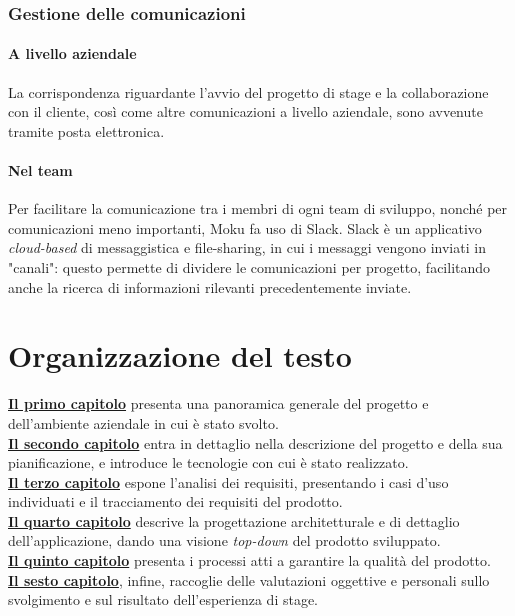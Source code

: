 \subsubsection{Gestione delle comunicazioni}
\paragraph{A livello aziendale} La corrispondenza riguardante l'avvio del progetto di stage e la collaborazione con il cliente, così come altre comunicazioni a livello aziendale, sono avvenute tramite posta elettronica.
\paragraph{Nel team} Per facilitare la comunicazione tra i membri di ogni team di sviluppo, nonché per comunicazioni meno importanti, Moku fa uso di Slack. Slack è un applicativo \textit{cloud-based} di messaggistica e file-sharing, in cui i messaggi vengono inviati in "canali": questo permette di dividere le comunicazioni per progetto, facilitando anche la ricerca di informazioni rilevanti precedentemente inviate.

\section{Organizzazione del testo}
\textbf{\hyperref[introduction]{Il primo capitolo}} presenta una panoramica generale del progetto e dell'ambiente aziendale in cui è stato svolto.\\
\textbf{\hyperref[chap2]{Il secondo capitolo}} entra in dettaglio nella descrizione del progetto e della sua pianificazione, e introduce le tecnologie con cui è stato realizzato.\\
\textbf{\hyperref[chap3]{Il terzo capitolo}} espone l'analisi dei requisiti, presentando i casi d'uso individuati e il tracciamento dei requisiti del prodotto.\\
\textbf{\hyperref[chap4]{Il quarto capitolo}} descrive la progettazione architetturale e di dettaglio dell'applicazione, dando una visione \textit{top-down} del prodotto sviluppato.\\
\textbf{\hyperref[chap5]{Il quinto capitolo}} presenta i processi atti a garantire la qualità del prodotto.\\
\textbf{\hyperref[conclusion]{Il sesto capitolo}}, infine, raccoglie delle valutazioni oggettive e personali sullo svolgimento e sul risultato dell'esperienza di stage.

